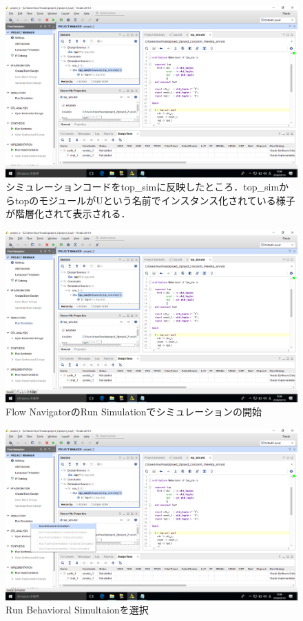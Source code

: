 \documentclass[a4paper,dvipdfmx]{jsarticle}
\begin{document}
 \begin{figure}[H]
  \begin{center}
   \includegraphics[width=.8\textwidth]{chapter04_figures/VirtualBox_Windows10_19_03_2018_12_06_25.png}
  \end{center}
  \caption{シミュレーションコードをtop\_simに反映したところ．top\_simからtopのモジュールがUという名前でインスタンス化されている様子が階層化されて表示される．}
 \end{figure}

 \begin{figure}[H]
  \begin{center}
   \includegraphics[width=.8\textwidth]{chapter04_figures/VirtualBox_Windows10_19_03_2018_12_06_33.png}
  \end{center}
  \caption{Flow NavigatorのRun Simulationでシミュレーションの開始}
 \end{figure}

 \begin{figure}[H]
  \begin{center}
   \includegraphics[width=.8\textwidth]{chapter04_figures/VirtualBox_Windows10_19_03_2018_12_06_40.png}
  \end{center}
  \caption{Run Behavioral Simultaionを選択}
 \end{figure}
\end{document}
